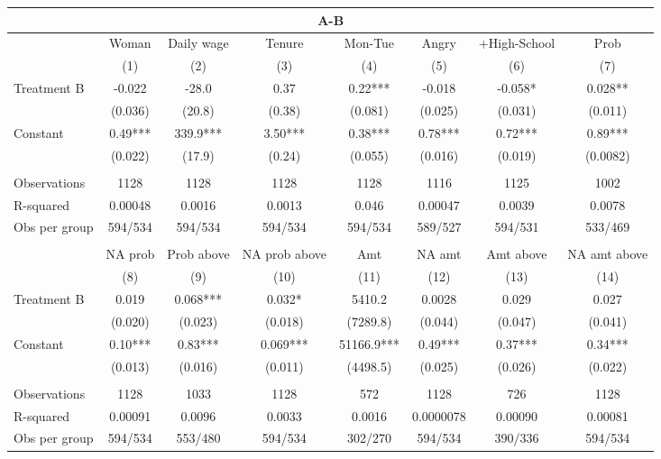 \begin{tabular}{lccccccc}
\toprule
\multicolumn{8}{c}{A-B} \\
\midrule
\midrule
      & Woman  & Daily wage & Tenure & Mon-Tue & Angry & +High-School & Prob \\
\midrule
\midrule
      & (1)   & (2)   & (3)   & (4)   & (5)   & (6)   & (7) \\
\midrule
Treatment B & -0.022 & -28.0 & 0.37  & 0.22*** & -0.018 & -0.058* & 0.028** \\
      & (0.036) & (20.8) & (0.38) & (0.081) & (0.025) & (0.031) & (0.011) \\
Constant  & 0.49*** & 339.9*** & 3.50*** & 0.38*** & 0.78*** & 0.72*** & 0.89*** \\
      & (0.022) & (17.9) & (0.24) & (0.055) & (0.016) & (0.019) & (0.0082) \\
      &       &       &       &       &       &       &  \\
\midrule
Observations & 1128  & 1128  & 1128  & 1128  & 1116  & 1125  & 1002 \\
R-squared & 0.00048 & 0.0016 & 0.0013 & 0.046 & 0.00047 & 0.0039 & 0.0078 \\
Obs per group & 594/534 & 594/534 & 594/534 & 594/534 & 589/527 & 594/531 & 533/469 \\
\midrule
\midrule
      &       &       &       &       &       &       &  \\
      & NA prob & Prob above & NA prob above & Amt   & NA amt & Amt above & NA amt above \\
\midrule
\midrule
      & (8)   & (9)   & (10)  & (11)  & (12)  & (13)  & (14) \\
\midrule
Treatment B & 0.019 & 0.068*** & 0.032* & 5410.2 & 0.0028 & 0.029 & 0.027 \\
      & (0.020) & (0.023) & (0.018) & (7289.8) & (0.044) & (0.047) & (0.041) \\
Constant  & 0.10*** & 0.83*** & 0.069*** & 51166.9*** & 0.49*** & 0.37*** & 0.34*** \\
      & (0.013) & (0.016) & (0.011) & (4498.5) & (0.025) & (0.026) & (0.022) \\
      &       &       &       &       &       &       &  \\
\midrule
Observations & 1128  & 1033  & 1128  & 572   & 1128  & 726   & 1128 \\
R-squared & 0.00091 & 0.0096 & 0.0033 & 0.0016 & 0.0000078 & 0.00090 & 0.00081 \\
Obs per group & 594/534 & 553/480 & 594/534 & 302/270 & 594/534 & 390/336 & 594/534 \\
\bottomrule
\bottomrule
\end{tabular}%
